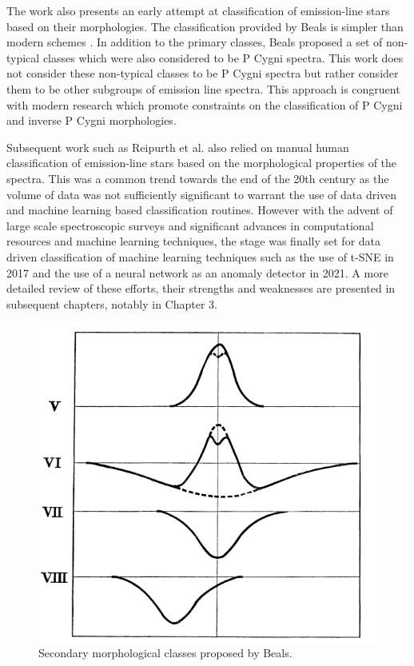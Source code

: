 The work also presents an early attempt at classification of emission-line stars based on their morphologies. The classification provided by Beals is simpler than modern schemes \cite{reipurth1996hupalpha}. In addition to the primary classes, Beals proposed a set of non-typical classes which were also considered to be P Cygni spectra. This work does not consider these non-typical classes to be P Cygni spectra but rather consider them to be other subgroups of emission line spectra. This approach is congruent with modern research \cite{vcotar2021galah}\cite{zhang2021catalog}\cite{reipurth1996hupalpha} which promote constraints on the classification of P Cygni and inverse P Cygni morphologies. 

Subsequent work such as Reipurth et al. \cite{reipurth1996hupalpha} also relied on manual human classification of emission-line stars based on the morphological properties of the spectra. This was a common trend towards the end of the 20th century as the volume of data was not sufficiently significant to warrant the use of data driven and machine learning based classification routines. However with the advent of large scale spectroscopic surveys and significant advances in computational resources and machine learning techniques, the stage was finally set for data driven classification of machine learning techniques such as the use of t-SNE in 2017 \cite{traven2017galah} and the use of a neural network as an anomaly detector in 2021\cite{vcotar2021galah}. A more detailed review of these efforts, their strengths and weaknesses are presented in subsequent chapters, notably in Chapter 3.

\begin{figure}[!htb]
\centering
\includegraphics[scale=.50]{figures/beals class 2.png}
\caption{Secondary morphological classes proposed by Beals.}
\end{figure}


